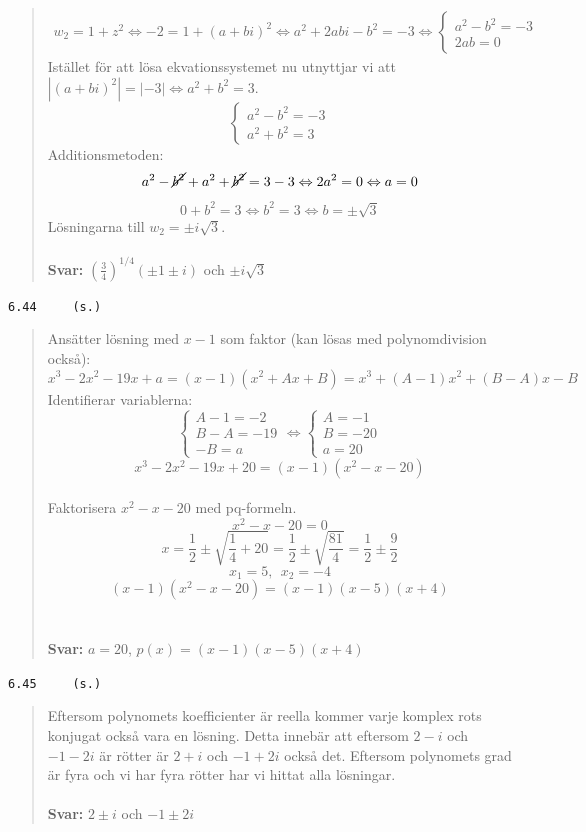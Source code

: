 \documentclass[a4paper]{article}
\newcommand{\tskcol}[1]{\textcolor{tskcol}{#1}}
\begin{document}
\begin{quotation}
		\begin{align*}
		w_2=1+z^2 \Leftrightarrow
		-2=1+(a+bi)^2 \Leftrightarrow
		a^2+2abi-b^2=-3 \Leftrightarrow
		\begin{cases}
		a^2-b^2=-3 \\
		2ab = 0
		\end{cases}
		\end{align*}
		Istället för att lösa ekvationssystemet nu utnyttjar vi  att $|(a+bi)^2|=|-3| \Leftrightarrow a^2+b^2=3$.
		\[\begin{cases}
		a^2-b^2=-3 \\
		a^2+b^2=3
		\end{cases}\]
		Additionsmetoden:
		\[a^2-\cancel{b^2}+a^2+\cancel{b^2} = 3-3 \Leftrightarrow
		2a^2=0 \Leftrightarrow
		a=0\]
		\[0+b^2=3 \Leftrightarrow
		b^2=3 \Leftrightarrow
		b=\pm\sqrt{3}\]
		Lösningarna till $w_2=\pm i\sqrt{3}$.
		\\ \\
		\textbf{Svar:} $\left(\frac{3}{4}\right)^{1/4}(\pm1\pm i)$ och $\pm i\sqrt{3}$
	\end{quotation}
	
	\texttt{\tskcol{6.44~~~~ (s.)}}
	\begin{quotation}
		\noindent
		Ansätter lösning med $x-1$ som faktor (kan lösas med polynomdivision också): \\
		\[x^3-2x^2-19x+a=(x-1)(x^2+Ax+B)=x^3+(A-1)x^2+(B-A)x-B\]
		Identifierar variablerna: \\
		\[\begin{cases}
		A-1=-2 \\
		B-A=-19 \\
		-B=a
		\end{cases}
		\Leftrightarrow
		\begin{cases}
		A=-1 \\
		B=-20 \\
		a=20
		\end{cases}\]
		\[x^3-2x^2-19x+20=(x-1)(x^2-x-20)\] \\
		Faktorisera $x^2-x-20$ med pq-formeln.
		\[x^2-x-20=0\]
		\[x=\frac{1}{2}\pm\sqrt{\frac{1}{4}+20}=
		\frac{1}{2}\pm\sqrt{\frac{81}{4}}=
		\frac{1}{2}\pm\frac{9}{2}\]
		\[x_1=5,~~x_2=-4\]
		\[(x-1)(x^2-x-20)=(x-1)(x-5)(x+4)\]
		\\ \\
		\textbf{Svar:} $a=20$, $p(x)=(x-1)(x-5)(x+4)$
	\end{quotation}
	
	\texttt{\tskcol{6.45~~~~ (s.)}}
	\begin{quotation}
		\noindent
		Eftersom polynomets koefficienter är reella kommer varje komplex rots konjugat också vara en lösning. Detta innebär att eftersom $2-i$ och $-1-2i$ är rötter är $2+i$ och $-1+2i$ också det. Eftersom polynomets grad är fyra och vi har fyra rötter har vi hittat alla lösningar.
		\\ \\
		\textbf{Svar:} $2\pm i$ och $-1\pm2i$
	\end{quotation}
	
\end{document}
